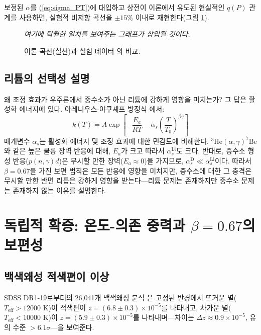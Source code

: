 \documentclass[11pt,a4paper]{article}
\newcommand{\alp}{\alpha}
\theoremstyle{remark}
\begin{document}
	보정된 \(\alp\)를 (\ref{eq:sigma_PT})에 대입하고 상전이 이론에서 유도된 현실적인 \(q(P)\) 관계를 사용하면, 실험적 비저항 곡선을 \(\pm 15\%\) 이내로 재현한다(그림 \ref{fig:fitted}).
	
	\begin{figure}[H]
		\centering
		\caption{이론 곡선(실선)과 실험 데이터 \cite{fortov2001}의 비교.}
		\label{fig:fitted}
		\textit{여기에 탁월한 일치를 보여주는 그래프가 삽입될 것이다.}
	\end{figure}
	
	\subsection{리튬의 선택성 설명}
	
	왜 조정 효과가 우주론에서 중수소가 아닌 리튬에 강하게 영향을 미치는가? 그 답은 활성화 에너지에 있다. 아레니우스-야쿠셰프 방정식 \cite{appendixC}에서:
	\begin{equation}
		k(T) = A \exp\left[-\frac{E_a}{RT} - \alp_s \left(\frac{T}{T_0}\right)^{\beta\gamma}\right]
		\label{eq:arrhenius_yak}
	\end{equation}
	매개변수 \(\alp_s\)는 활성화 에너지 및 조정 효과에 대한 민감도에 비례한다. \(^3\mathrm{He}(\alpha,\gamma)^7\mathrm{Be}\)와 같은 높은 쿨롱 장벽 반응에 대해, \(E_a\)가 크고 따라서 \(\alp_s^{\mathrm{Li}}\)도 크다. 반대로, 중수소 형성 반응(\(p(n,\gamma)d\))은 무시할 만한 장벽(\(E_a \approx 0\))을 가지므로, \(\alp_s^{\mathrm{D}} \ll \alp_s^{\mathrm{Li}}\)이다. 따라서 \(\beta = 0.67\)을 가진 보편 법칙은 모든 반응에 영향을 미치지만, 중수소에 대한 그 충격은 무시할 만한 반면 리튬은 강하게 영향을 받는다—리튬 문제는 존재하지만 중수소 문제는 존재하지 않는 이유를 설명한다.
	
	\section{독립적 확증: 온도-의존 중력과 \(\beta = 0.67\)의 보편성}
	\label{sec:universal-proof}
	
	\subsection{백색왜성 적색편이 이상}
	\label{subsec:wd-anomaly}
	
	SDSS DR1-19로부터의 26,041개 백색왜성 분석 \cite{Crumpler2024}은 고정된 반경에서 뜨거운 별(\(T_{\mathrm{eff}} > 12000\) K)이 적색편이 \(z = (6.8 \pm 0.3) \times 10^{-5}\)를 나타내고, 차가운 별(\(T_{\mathrm{eff}} < 10000\) K)이 \(z = (5.9 \pm 0.3) \times 10^{-5}\)를 나타내며—차이는 \(\Delta z \approx 0.9 \times 10^{-5}\), 유의 수준 \(>6.1\sigma\)—을 보여준다.
	
\end{document}
